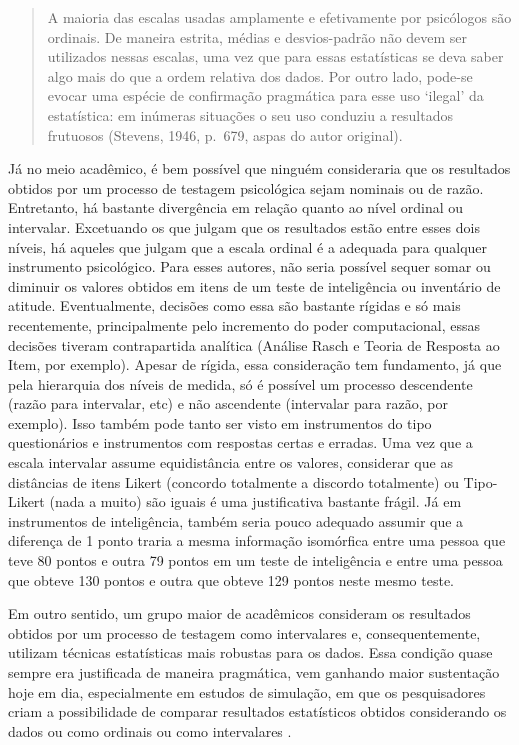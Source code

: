 \documentclass[
]{book}
\begin{document}
\begin{quote}
A maioria das escalas usadas amplamente e efetivamente por psicólogos são ordinais. De maneira estrita, médias e desvios-padrão não devem ser utilizados nessas escalas, uma vez que para essas estatísticas se deva saber algo mais do que a ordem relativa dos dados. Por outro lado, pode-se evocar uma espécie de confirmação pragmática para esse uso `ilegal' da estatística: em inúmeras situações o seu uso conduziu a resultados frutuosos (Stevens, 1946, p.~679, aspas do autor original).
\end{quote}

Já no meio acadêmico, é bem possível que ninguém consideraria que os resultados obtidos por um processo de testagem psicológica sejam nominais ou de razão. Entretanto, há bastante divergência em relação quanto ao nível ordinal ou intervalar. Excetuando os que julgam que os resultados estão entre esses dois níveis, há aqueles que julgam que a escala ordinal é a adequada para qualquer instrumento psicológico. Para esses autores, não seria possível sequer somar ou diminuir os valores obtidos em itens de um teste de inteligência ou inventário de atitude. Eventualmente, decisões como essa são bastante rígidas e só mais recentemente, principalmente pelo incremento do poder computacional, essas decisões tiveram contrapartida analítica (Análise Rasch e Teoria de Resposta ao Item, por exemplo).
Apesar de rígida, essa consideração tem fundamento, já que pela hierarquia dos níveis de medida, só é possível um processo descendente (razão para intervalar, etc) e não ascendente (intervalar para razão, por exemplo). Isso também pode tanto ser visto em instrumentos do tipo questionários e instrumentos com respostas certas e erradas. Uma vez que a escala intervalar assume equidistância entre os valores, considerar que as distâncias de itens Likert (concordo totalmente a discordo totalmente) ou Tipo-Likert (nada a muito) são iguais é uma justificativa bastante frágil. Já em instrumentos de inteligência, também seria pouco adequado assumir que a diferença de 1 ponto traria a mesma informação isomórfica entre uma pessoa que teve 80 pontos e outra 79 pontos em um teste de inteligência e entre uma pessoa que obteve 130 pontos e outra que obteve 129 pontos neste mesmo teste.

Em outro sentido, um grupo maior de acadêmicos consideram os resultados obtidos por um processo de testagem como intervalares e, consequentemente, utilizam técnicas estatísticas mais robustas para os dados. Essa condição quase sempre era justificada de maneira pragmática, vem ganhando maior sustentação hoje em dia, especialmente em estudos de simulação, em que os pesquisadores criam a possibilidade de comparar resultados estatísticos obtidos considerando os dados ou como ordinais ou como intervalares \citep{Wu2017}.
\end{document}
